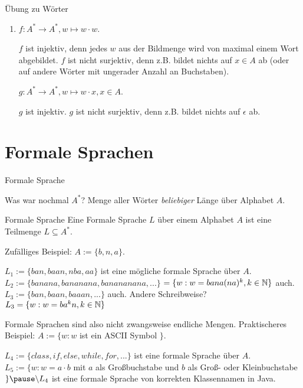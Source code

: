 \begin{frame}{Übung zu Wörter}
	\begin{enumerate}
		\item $f: A^* \rightarrow A^*, w \mapsto w \cdot w$.
		\begin{itemize}
			\pitem $f$ ist injektiv\pause , denn jedes $w$ aus der Bildmenge wird von maximal einem Wort abgebildet.
			\pitem $f$ ist nicht surjektiv\pause , denn z.B. bildet nichts auf $x \in A$ ab (oder auf andere Wörter mit ungerader Anzahl an Buchstaben).
		\end{itemize}
		\pitem $g: A^* \rightarrow A^*, w \mapsto w \cdot x, x \in A$.
		\begin{itemize}
			\pitem $g$ ist injektiv.
			\pitem $g$ ist nicht surjektiv\pause , denn z.B. bildet nichts auf $\epsilon$ ab.
		\end{itemize}
	\end{enumerate}
\end{frame}

\section{Formale Sprachen}

\begin{frame}{Formale Sprache}
	\begin{itemize}
		\pitem Was war nochmal $A^*$? Menge aller Wörter \emph{beliebiger} Länge über Alphabet $A$.
	\end{itemize}

	\pause
	
	\begin{block}{Formale Sprache}
		Eine Formale Sprache $L$ über einem Alphabet $A$ ist eine Teilmenge $L \subseteq A^*$.
	\end{block}

	\begin{itemize}
		\pitem Zufälliges Beispiel: \pause $A := \{b, n, a\}$.
		\begin{itemize}
			\pitem $L_1 := \{ban, baan, nba, aa\}$ ist eine mögliche formale Sprache über $A$.
			\pitem $L_2 := \{banana, bananana, banananana, ...\}$ \pause $ = \{w : w = bana(na)^k, k \in \mathbb{N}\}$ auch.
			\pitem $L_3 := \{ban, baan, baaan, ...\}$ auch. \pause Andere Schreibweise? \pause \\ $ L_3 = \{w : w = ba^kn, k \in \mathbb{N} \}$
		\end{itemize}
		\pitem Formale Sprachen sind also nicht zwangsweise endliche Mengen.
		\pitem Praktischeres Beispiel: $A := \{w : w $ ist ein ASCII Symbol $\}$.
		\begin{itemize}
			\pitem $L_4 := \{class, if, else, while, for, ...\}$ ist eine formale Sprache über $A$.
			\pitem $L_5 := \{w : w = a \cdot b$ mit $a$ als Großbuchstabe und $b$ als Groß- oder Kleinbuchstabe $ \} \pause \backslash L_4$ \pause ist eine formale Sprache von korrekten Klassennamen in Java.
		\end{itemize}
	\end{itemize}
\end{frame}

